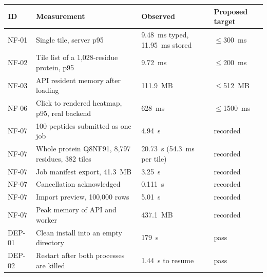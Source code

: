 
{\small\setlength{\tabcolsep}{3pt}

\begin{tabularx}{\textwidth}{lXll}
\toprule
ID & Measurement & Observed & Proposed target \\
\midrule
NF-01 & Single tile, server p95 & 9.48~ms typed, 11.95~ms stored & $\le$300~ms \\
NF-02 & Tile list of a 1,028-residue protein, p95 & 9.72~ms & $\le$200~ms \\
NF-03 & API resident memory after loading & 111.9~MB & $\le$512~MB \\
NF-06 & Click to rendered heatmap, p95, real backend & 628~ms & $\le$1500~ms \\
NF-07 & 100 peptides submitted as one job & 4.94~s & recorded \\
NF-07 & Whole protein Q8NF91, 8,797 residues, 382 tiles & 20.73~s (54.3~ms per tile) & recorded \\
NF-07 & Job manifest export, 41.3~MB & 3.25~s & recorded \\
NF-07 & Cancellation acknowledged & 0.111~s & recorded \\
NF-07 & Import preview, 100,000 rows & 5.01~s & recorded \\
NF-07 & Peak memory of API and worker & 437.1~MB & recorded \\
DEP-01 & Clean install into an empty directory & 179~s & pass \\
DEP-02 & Restart after both processes are killed & 1.44~s to resume & pass \\
\bottomrule
\end{tabularx}}

